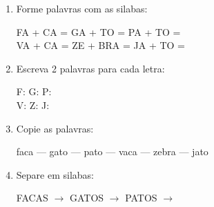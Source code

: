 \begin{exercicio}
\begin{enumerate}[resume]
  \item Forme palavras com as silabas:
  \begin{center}
  FA + CA = \underline{\hspace{2cm}} \quad GA + TO = \underline{\hspace{2cm}} \quad PA + TO = \underline{\hspace{2cm}} \\
  VA + CA = \underline{\hspace{2cm}} \quad ZE + BRA = \underline{\hspace{2cm}} \quad JA + TO = \underline{\hspace{2cm}}
  \end{center}

  \item Escreva 2 palavras para cada letra:
  \begin{center}
  F: \underline{\hspace{3cm}} \underline{\hspace{3cm}} \quad G: \underline{\hspace{3cm}} \underline{\hspace{3cm}} \quad P: \underline{\hspace{3cm}} \underline{\hspace{3cm}} \\
  V: \underline{\hspace{3cm}} \underline{\hspace{3cm}} \quad Z: \underline{\hspace{3cm}} \underline{\hspace{3cm}} \quad J: \underline{\hspace{3cm}} \underline{\hspace{3cm}}
  \end{center}

  \item Copie as palavras:
  \begin{center}
  faca --- gato --- pato --- vaca --- zebra --- jato
  \end{center}

  \item Separe em silabas:
  \begin{center}
  FACAS $\rightarrow$ \underline{\hspace{1cm}} \underline{\hspace{1cm}} \quad GATOS $\rightarrow$ \underline{\hspace{1cm}} \underline{\hspace{1cm}} \quad PATOS $\rightarrow$ \underline{\hspace{1cm}} \underline{\hspace{1cm}}
  \end{center}
\end{enumerate}


\end{exercicio}
